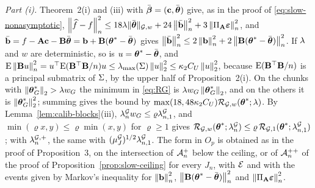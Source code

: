 \emph{Part (i).} Theorem~2(i) and (iii) with $\bar\bbeta = (\bc,\thbar)$ give,
as in the proof of \eqref{eq:slow-nonasymptotic},
$\normn{\widehat{f}-f}^{2} \le 18\pen\nGw{\thbar} + 24\normn{\bbar}^{2} +
3\normn{\PA\bveps}^{2}$, and $\bbar = f - \Amat\bc - \Bmat\thbar = \bb +
\Bmat(\thetastar-\thbar)$ gives $\normn{\bbar}^{2} \le 2\normn{\bb}^{2} +
2\normn{\Bmat(\thetastar-\thbar)}^{2}$. If $\pen$ and $w$ are deterministic,
so is $u = \thetastar-\thbar$, and $\E\normn{\Bmat u}^{2} =
u\T\E(\Bmat\T\Bmat/n)u \le \lmaxx(\Gram)\norm{u}_{2}^{2} \le
\kappa_2C_U\norm{u}_{2}^{2}$, because $\E(\Bmat\T\Bmat/n)$ is a principal
submatrix of $\Gram$, by the upper half of Proposition~2(i). On the chunks with
$\norm{\thetastar_{G}}_{2} > \pen w_{G}$ the minimum in \eqref{eq:RG} is
$\pen w_{G}\norm{\thetastar_{G}}_{2}$, and on the others it is
$\norm{\thetastar_{G}}_{2}^{2}$; summing gives the bound by
$\max(18,48\kappa_2C_U)\RGw(\thetastar;\pen)$. By
Lemma~\ref{lem:calib-blocks}(iii), $\lamG w_{G} \le \varrho\lamGone$, and
$\min(\varrho x,y) \le \varrho\min(x,y)$ for $\varrho \ge 1$ gives
$\RGw(\thetastar;\lamG) \le \varrho\,\RGone(\thetastar;\lamGone)$; with
$\lamGp$, the same with $(\mu^{\Gcal}_{J})^{1/2}\lamGone$. The form in $O_p$
is obtained as in the proof of Proposition~3, on the intersection of
$\Acal^{+}$ below the ceiling, or of $\Acal^{++}$ of the proof of
Proposition~\ref{prop:slow-ceiling} for every $J_n$, with $\Ecal$ and with
the events given by Markov's inequality for $\normn{\bb}^{2}$,
$\normn{\Bmat(\thetastar-\thbar)}^{2}$ and $\normn{\PA\bveps}^{2}$.

